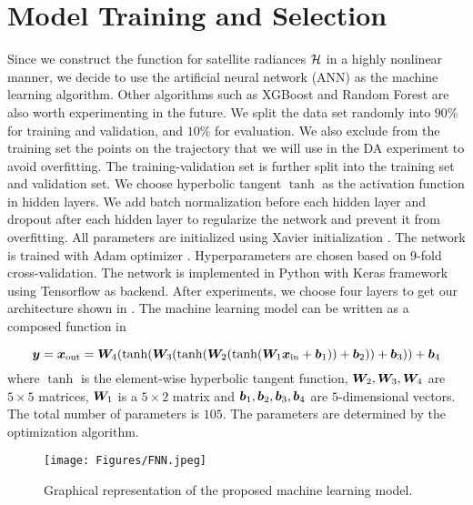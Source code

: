 \section{Model Training and Selection}
\par Since we construct the function for satellite radiances $\mathcal{H}$ in a highly nonlinear manner, we decide to use the artificial neural network (ANN) as the machine learning algorithm. Other algorithms such as XGBoost and Random Forest are also worth experimenting in the future. We split the data set randomly into $90\%$ for training and validation, and $10\%$ for evaluation. We also exclude from the training set the points on the trajectory that we will use in the DA experiment to avoid overfitting. The training-validation set is further split into the training set and validation set. We choose hyperbolic tangent $\tanh$ as the activation function in hidden layers. We add batch normalization \cite{BatchNorm} before each hidden layer and dropout \cite{Dropout} after each hidden layer to regularize the network and prevent it from overfitting. All parameters are initialized using Xavier initialization \cite{Xavier}. The network is trained with Adam optimizer \cite{Adam}. Hyperparameters are chosen based on 9-fold cross-validation. The network is implemented in Python with Keras framework using Tensorflow as backend. After experiments, we choose four layers to get our architecture shown in . The machine learning model can be written as a composed function in 

\begin{equation}\label{eq:ourml}
\bm{y} = \bm{x}_{\text{out}} = \bm{W}_4(\tanh(\bm{W}_3(\tanh(\bm{W}_2(\tanh(\bm{W}_1 \bm{x}_{\text{in}} + \bm{b}_1))+\bm{b}_2))+\bm{b}_3))+\bm{b}_4
\end{equation}
where $\tanh$ is the element-wise hyperbolic tangent function, $\bm{W}_2,\bm{W}_3,\bm{W}_4$ are $5\times 5$ matrices, $\bm{W}_1$ is a $5\times 2$ matrix and $\bm{b}_1,\bm{b}_2,\bm{b}_3,\bm{b}_4$ are $5$-dimensional vectors. The total number of parameters is $105$. The parameters are determined by the optimization algorithm.

\begin{figure}\label{fig:FNN}
\begin{center}
\texttt{[image: Figures/FNN.jpeg]} 
\end{center}
\caption{Graphical representation of the proposed machine learning model.}
\end{figure}

